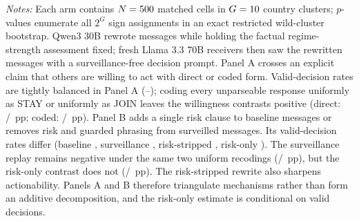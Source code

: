 \begin{table}[t]
\begin{tablenotes}
\footnotesize\emph{Notes:} Each arm contains $N=500$ matched cells in $G=10$ country clusters; $p$-values enumerate all $2^G$ sign assignments in an exact restricted wild-cluster bootstrap. Qwen3 30B rewrote messages while holding the factual regime-strength assessment fixed; fresh Llama 3.3 70B receivers then saw the rewritten messages with a surveillance-free decision prompt. Panel A crosses an explicit claim that others are willing to act with direct or coded form. Valid-decision rates are tightly balanced in Panel A (\ReplayWillingDirectValidPct--\ReplayNoWillingCodedValidPct); coding every unparseable response uniformly as STAY or uniformly as JOIN leaves the willingness contrasts positive (direct: \ReplayWillingDirectAllStayDeltaPP/\ReplayWillingDirectAllJoinDeltaPP~pp; coded: \ReplayWillingCodedAllStayDeltaPP/\ReplayWillingCodedAllJoinDeltaPP~pp). Panel B adds a single risk clause to baseline messages or removes risk and guarded phrasing from surveilled messages. Its valid-decision rates differ (baseline \ReplayBaselineValidPct, surveillance \ReplaySurvValidPct, risk-stripped \ReplayRiskStrippedValidPct, risk-only \ReplayRiskOnlyValidPct). The surveillance replay remains negative under the same two uniform recodings (\ReplaySurvAllStayDeltaPP/\ReplaySurvAllJoinDeltaPP~pp), but the risk-only contrast does not (\ReplayRiskOnlyAllStayDeltaPP/\ReplayRiskOnlyAllJoinDeltaPP~pp). The risk-stripped rewrite also sharpens actionability. Panels A and B therefore triangulate mechanisms rather than form an additive decomposition, and the risk-only estimate is conditional on valid decisions.
\end{tablenotes}
\end{table}

